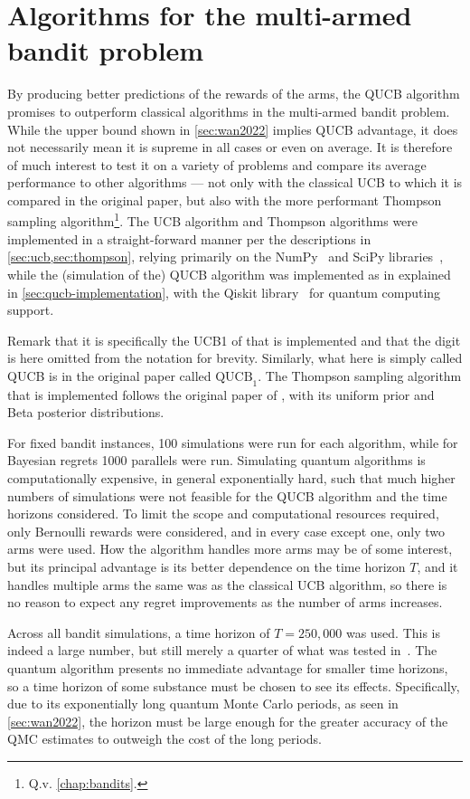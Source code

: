 \section{Algorithms for the multi-armed bandit problem}
By producing better predictions of the rewards of the arms, the QUCB algorithm promises to outperform classical algorithms in the multi-armed bandit problem.
While the upper bound shown in \cref{sec:wan2022} implies QUCB advantage, it does not necessarily mean it is supreme in all cases or even on average.
It is therefore of much interest to test it on a variety of problems and compare its average performance to other algorithms — not only with the classical UCB to which it is compared in the original paper, but also with the more performant Thompson sampling algorithm\footnote{Q.v. \cref{chap:bandits}.}.
The UCB algorithm and Thompson algorithms were implemented in a straight-forward manner per the descriptions in \cref{sec:ucb,sec:thompson}, relying primarily on the NumPy~\autocite{numpy} and SciPy libraries~\autocite{scipy}, while the (simulation of the) QUCB algorithm was implemented as in explained in \cref{sec:qucb-implementation}, with the Qiskit library~\autocite{qiskit} for quantum computing support.

Remark that it is specifically the UCB1 of \textcite{auer2002} that is implemented and that the digit is here omitted from the notation for brevity.
Similarly, what here is simply called QUCB is in the original paper called $\text{QUCB}_1$.
The Thompson sampling algorithm that is implemented follows the original paper of \textcite{thompson1933}, with its uniform prior and Beta posterior distributions.


For fixed bandit instances, 100 simulations were run for each algorithm, while for Bayesian regrets 1000 parallels were run.
Simulating quantum algorithms is computationally expensive, in general exponentially hard, such that much higher numbers of simulations were not feasible for the QUCB algorithm and the time horizons considered.
To limit the scope and computational resources required, only Bernoulli rewards were considered, and in every case except one, only two arms were used.
How the algorithm handles more arms may be of some interest, but its principal advantage is its better dependence on the time horizon $T$, and it handles multiple arms the same was as the classical UCB algorithm, so there is no reason to expect any regret improvements as the number of arms increases.

Across all bandit simulations, a time horizon of $T=250,000$ was used.
This is indeed a large number, but still merely a quarter of what was tested in~\autocite{wan2022}.
The quantum algorithm presents no immediate advantage for smaller time horizons, so  a time horizon of some substance must be chosen to see its effects.
Specifically, due to its exponentially long quantum Monte Carlo periods, as seen in \cref{sec:wan2022}, the horizon must be large enough for the greater accuracy of the QMC estimates to outweigh the cost of the long periods.

